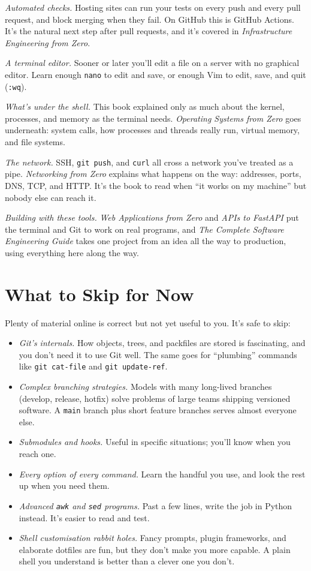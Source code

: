 \emph{Automated checks.} Hosting sites can run your tests on every push and every pull request, and block merging when they fail. On GitHub this is GitHub Actions. It's the natural next step after pull requests, and it's covered in \emph{Infrastructure Engineering from Zero}.

\emph{A terminal editor.} Sooner or later you'll edit a file on a server with no graphical editor. Learn enough \texttt{nano} to edit and save, or enough Vim to edit, save, and quit (\texttt{:wq}).

\emph{What's under the shell.} This book explained only as much about the kernel, processes, and memory as the terminal needs. \emph{Operating Systems from Zero} goes underneath: system calls, how processes and threads really run, virtual memory, and file systems.

\emph{The network.} SSH, \texttt{git\ push}, and \texttt{curl} all cross a network you've treated as a pipe. \emph{Networking from Zero} explains what happens on the way: addresses, ports, DNS, TCP, and HTTP. It's the book to read when ``it works on my machine'' but nobody else can reach it.

\emph{Building with these tools.} \emph{Web Applications from Zero} and \emph{APIs to FastAPI} put the terminal and Git to work on real programs, and \emph{The Complete Software Engineering Guide} takes one project from an idea all the way to production, using everything here along the way.

\section{What to Skip for Now}\label{13-where-to-go-from-here:what-to-skip-for-now}

Plenty of material online is correct but not yet useful to you. It's safe to skip:

\begin{itemize}
\tightlist
\item
  \emph{Git's internals.} How objects, trees, and packfiles are stored is fascinating, and you don't need it to use Git well. The same goes for ``plumbing'' commands like \texttt{git\ cat-file} and \texttt{git\ update-ref}.
\item
  \emph{Complex branching strategies.} Models with many long-lived branches (develop, release, hotfix) solve problems of large teams shipping versioned software. A \texttt{main} branch plus short feature branches serves almost everyone else.
\item
  \emph{Submodules and hooks.} Useful in specific situations; you'll know when you reach one.
\item
  \emph{Every option of every command.} Learn the handful you use, and look the rest up when you need them.
\item
  \emph{Advanced \texttt{awk} and \texttt{sed} programs.} Past a few lines, write the job in Python instead. It's easier to read and test.
\item
  \emph{Shell customisation rabbit holes.} Fancy prompts, plugin frameworks, and elaborate dotfiles are fun, but they don't make you more capable. A plain shell you understand is better than a clever one you don't.
\end{itemize}

